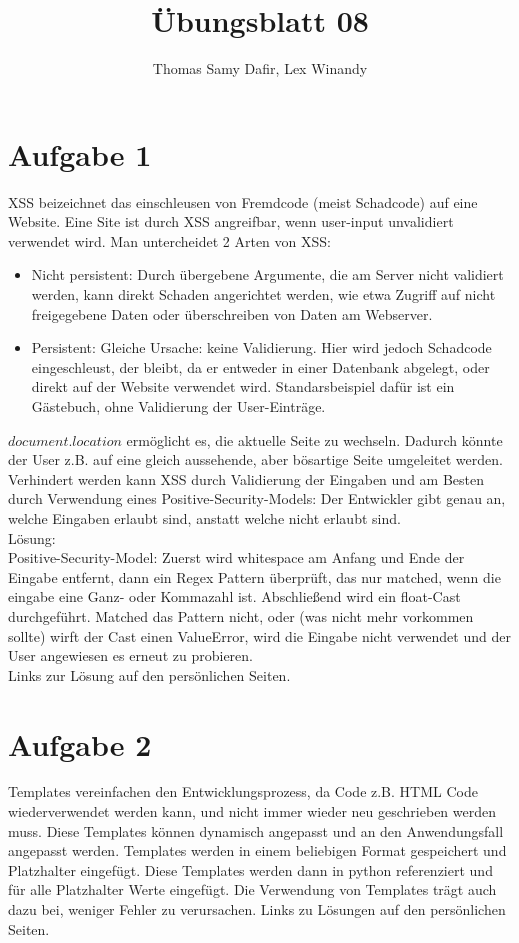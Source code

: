 \documentclass[12pt, a4paper]{report}
\title{Übungsblatt 08}
\author{Thomas Samy Dafir, Lex Winandy}
\date{}
\begin{document}
\maketitle

\section*{Aufgabe 1}
XSS beizeichnet das einschleusen von Fremdcode (meist Schadcode) auf eine Website. Eine Site ist durch XSS angreifbar, wenn user-input unvalidiert verwendet wird. Man untercheidet 2 Arten von XSS:
\begin{itemize}
	\item Nicht persistent: Durch übergebene Argumente, die am Server nicht validiert werden, kann direkt Schaden angerichtet werden, wie etwa Zugriff auf nicht freigegebene Daten oder überschreiben von Daten am Webserver.
	\item Persistent: Gleiche Ursache: keine Validierung. Hier wird jedoch Schadcode eingeschleust, der bleibt, da er entweder in einer Datenbank abgelegt, oder direkt auf der Website verwendet wird. Standarsbeispiel dafür ist ein Gästebuch, ohne Validierung der User-Einträge.
\end{itemize}
$document.location$ ermöglicht es, die aktuelle Seite zu wechseln. Dadurch könnte der User z.B. auf eine gleich aussehende, aber bösartige Seite umgeleitet werden.
Verhindert werden kann XSS durch Validierung der Eingaben und am Besten durch Verwendung eines Positive-Security-Models: Der Entwickler gibt genau an, welche Eingaben erlaubt sind, anstatt welche nicht erlaubt sind.\\
Lösung:\\
Positive-Security-Model: Zuerst wird whitespace am Anfang und Ende der Eingabe entfernt, dann ein Regex Pattern überprüft, das nur matched, wenn die eingabe eine Ganz- oder Kommazahl ist. Abschließend wird ein float-Cast durchgeführt. Matched das Pattern nicht, oder (was nicht mehr vorkommen sollte) wirft der Cast einen ValueError, wird die Eingabe nicht verwendet und der User angewiesen es erneut zu probieren.\\
Links zur Lösung auf den persönlichen Seiten.


\section*{Aufgabe 2}
Templates vereinfachen den Entwicklungsprozess, da Code z.B. HTML Code wiederverwendet werden kann, und nicht immer wieder neu geschrieben werden muss. Diese Templates können dynamisch angepasst und an den Anwendungsfall angepasst werden. Templates werden in einem beliebigen Format gespeichert und Platzhalter eingefügt. Diese Templates werden dann in python referenziert und für alle Platzhalter Werte eingefügt. Die Verwendung von Templates trägt auch dazu bei, weniger Fehler zu verursachen.
Links zu Lösungen auf den persönlichen Seiten.
\end{document}
